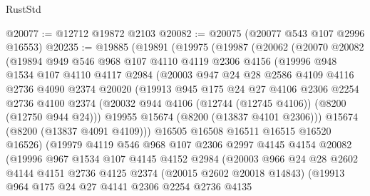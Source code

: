 \begin{lexlean}{RustStd}
\begin{coremodule}
@20077 := @12712 @19872 @2103
@20082 := @20075 (@20077 @543 @107 @2996 @16553)
@20235 := @19885
    (@19891
      (@19975
        (@19987
          (@20062
            (@20070
              @20082
              (@19894
                @949
                @546
                @968
                @107
                @4110
                @4119
                @2306
                @4156
                (@19996
                  @948
                  @1534
                  @107
                  @4110
                  @4117
                  @2984
                  (@20003
                    @947
                    @24
                    @28
                    @2586
                    @4109
                    @4116
                    @2736
                    @4090
                    @2374
                    @20020
                    (@19913
                      @945
                      @175
                      @24
                      @27
                      @4106
                      @2306
                      @2254
                      @2736
                      @4100
                      @2374
                      (@20032 @944 @4106 (@12744 (@12745 @4106)) (@8200 (@12750 @944 @24)))
                      @19955
                      @15674
                      (@8200 (@13837 @4101 @2306)))
                    @15674
                    (@8200 (@13837 @4091 @4109)))
                  @16505
                  @16508
                  @16511
                  @16515
                  @16520
                  @16526)
                (@19979
                  @4119
                  @546
                  @968
                  @107
                  @2306
                  @2997
                  @4145
                  @4154
                  @20082
                  (@19996
                    @967
                    @1534
                    @107
                    @4145
                    @4152
                    @2984
                    (@20003
                      @966
                      @24
                      @28
                      @2602
                      @4144
                      @4151
                      @2736
                      @4125
                      @2374
                      (@20015 @2602 @20018 @14843)
                      (@19913
                        @964
                        @175
                        @24
                        @27
                        @4141
                        @2306
                        @2254
                        @2736
                        @4135

\end{coremodule}
\end{lexlean}
